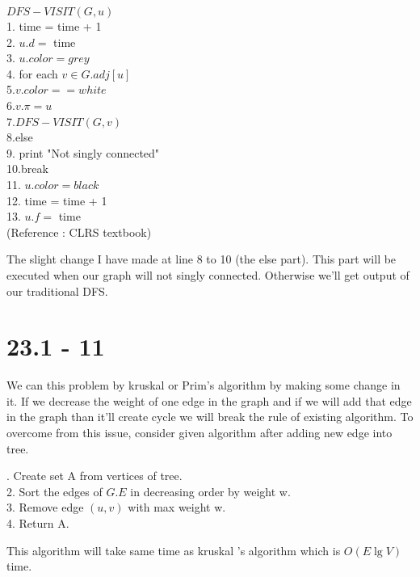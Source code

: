 \documentclass[a4paper, 11pt]{article}
\begin{document}
\vspace{5mm}
\noindent
$DFS-VISIT(G,u)$\\
1. time = time + 1\\
2. $u.d = $ time\\
3. $u.color = grey$\\
4. for each $v \in G.adj[u]$\\
5.\hspace{0.7cm}$v.color == white$\\
6.\hspace{1.4cm}$v.\pi = u$\\
7.\hspace{1.4cm}$DFS-VISIT(G,v)$\\
8.\hspace{0.7cm}else\\
9.\hspace{1.4cm} print "Not singly connected"\\
10.\hspace{1.4cm}break\\
11. $u.color = black$\\
12. time = time + 1\\
13. $u.f = $ time\\
(Reference : CLRS textbook)

\vspace{5mm}
\noindent
The slight change I have made at line 8 to 10 (the else part). This part will be executed when our graph will not singly connected. Otherwise we'll get output of our traditional DFS.

\section{23.1 - 11}
We can this problem by kruskal or Prim's algorithm by making some change in it. If we decrease the weight of one edge in the graph and if we will add that edge in the graph than it'll create cycle we will break the rule of existing algorithm. To overcome from this issue, consider given algorithm after adding new edge into tree.

\vspace{5mm}
. Create set A from vertices of tree.\\
2. Sort the edges of $G.E$ in decreasing order by weight w.\\
3. Remove edge $(u,v)$ with max weight w.\\
4. Return A.

\vspace{5mm}
\noindent
This algorithm will take same time as kruskal 's algorithm which is $O(E\lg V) $ 
time.
\end{document}

